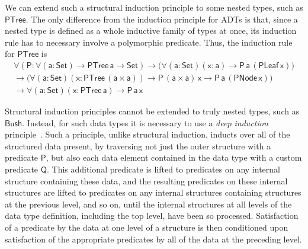 \documentclass[acmsmall,screen,review,anonymous]{acmart}
\theoremstyle{definition}
\begin{document}
We can extend such a structural induction principle to some nested types, such as $\mathsf{PTree}$.
The only difference from the induction principle for ADTs is that,
since a nested type is defined as a whole inductive family of types at once,
its induction rule has to necessary involve a polymorphic predicate.
Thus, the induction rule for $\mathsf{PTree}$ is
\begin{multline*}
\mathsf{\forall (P : \forall (a : Set) \to PTree\, a \to Set)
\to \big( \forall (a : Set) (x : a) \to P\,a\,(PLeaf\, x) \big)} \\
\mathsf{\to \big( \forall (a : Set) (x : PTree\,(a \times a)) \to P\,(a \times a)\,x \to P\,a\,(PNode\,x)\big)} \\
\mathsf{\to \forall (a : Set) (x : PTree\,a) \to P\,a\,x }
\end{multline*}

Structural induction principles cannot be extended to truly nested types, such as $\mathsf{Bush}$.
Instead, for such data types it is necessary to use a \emph{deep induction} principle~\cite{jp20}.
Such a principle, unlike structural induction, inducts over all of the structured data present,
by traversing not just the outer structure with a predicate $\mathsf{P}$,
but also each data element contained in the data type with a custom predicate $\mathsf{Q}$.
This additional predicate is lifted to predicates on any internal structure containing these data, and the resulting predicates on these internal structures are lifted to predicates on any internal structures containing structures at the previous level, and so on, until the internal structures at all levels of the data type definition, including the top level, have been so processed.
Satisfaction of a predicate by the data at one level of a structure is then conditioned upon satisfaction of the appropriate predicates by all of the data at the preceding level.
\end{document}
